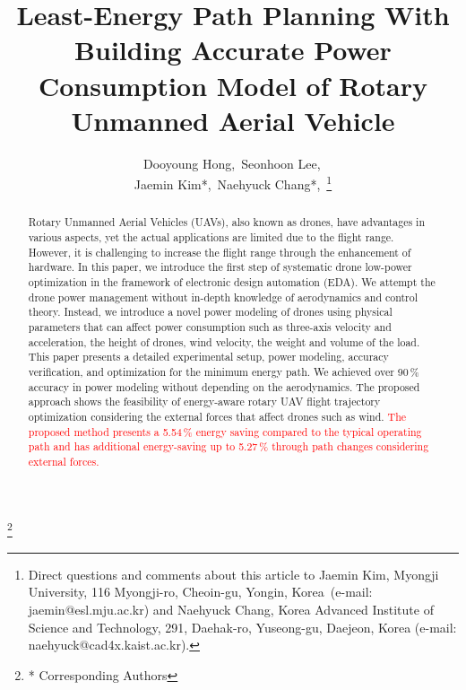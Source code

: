 \documentclass[journal]{./template/IEEEtran}
\begin{document}
\makeatletter

\newcommand\blfootnote[1]{%
  \begingroup
  \renewcommand\thefootnote{}\footnote{#1}%
  \addtocounter{footnote}{-1}%
  \endgroup
}

\newcommand\fs@norules{\def\@fs@cfont{\bfseries}\let\@fs@capt\floatc@ruled
  \def\@fs@pre{}%
  \def\@fs@post{}%
  \def\@fs@mid{\kern3pt}%
  \let\@fs@iftopcapt\iftrue}
\makeatother

\title{Least-Energy Path Planning With Building Accurate Power Consumption Model of Rotary Unmanned Aerial Vehicle\\
}
\author{
Dooyoung Hong,\,
Seonhoon Lee,\,\\
Jaemin Kim*,\,
Naehyuck Chang*,\,
\thanks{Direct questions and comments about this article to Jaemin Kim, Myongji University, 116 Myongji-ro, Cheoin-gu, Yongin, Korea\, (e-mail: jaemin@esl.mju.ac.kr) and Naehyuck Chang, Korea Advanced Institute of Science and Technology, 291, Daehak-ro, Yuseong-gu, Daejeon, Korea (e-mail: naehyuck@cad4x.kaist.ac.kr).}
}
\maketitle
\blfootnote{* Corresponding Authors}

\begin{abstract}

Rotary Unmanned Aerial Vehicles (UAVs), also known as drones, have advantages in various aspects, yet the actual applications are limited due to the flight range. However, it is challenging to increase the flight range through the enhancement of hardware. 
In this paper, we introduce the first step of systematic drone low-power %
optimization in the framework of electronic design automation (EDA). 
We attempt the drone power management without in-depth knowledge of aerodynamics and control theory. 
Instead, we introduce a novel power modeling of drones using physical parameters that can affect power consumption such as three-axis velocity and acceleration, the height of drones, wind velocity, the weight and volume of the load. 
This paper presents a detailed experimental setup, power modeling, accuracy verification, and optimization for the minimum energy path. 
We achieved over 90\,\% accuracy in power modeling without depending on the aerodynamics. 
The proposed approach shows the feasibility of energy-aware rotary UAV flight trajectory optimization considering the external forces that affect drones such as wind. \textcolor{red}{The proposed method presents a 5.54\,\% energy saving compared to the typical operating path and has additional energy-saving up to 5.27\,\% through path changes considering external forces.}
\label{Section: abstract}
\end{abstract}
\end{document}
